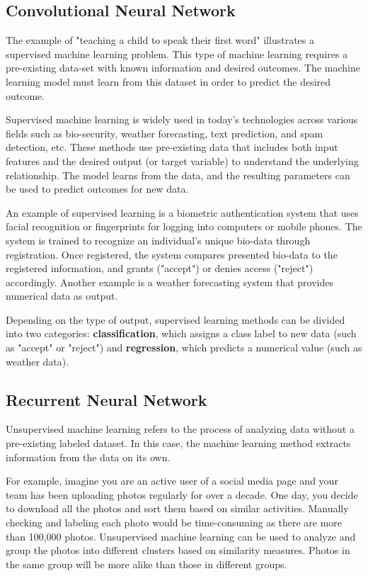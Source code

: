 \subsection{Convolutional Neural Network}
The example of "teaching a child to speak their first word" illustrates a supervised machine learning problem. This type of machine learning requires a pre-existing data-set with known information and desired outcomes. The machine learning model must learn from this dataset in order to predict the desired outcome.

Supervised machine learning is widely used in today's technologies across various fields such as bio-security, weather forecasting, text prediction, and spam detection, etc. These methods use pre-existing data that includes both input features and the desired output (or target variable) to understand the underlying relationship. The model learns from the data, and the resulting parameters can be used to predict outcomes for new data.

An example of supervised learning is a biometric authentication system that uses facial recognition or fingerprints for logging into computers or mobile phones. The system is trained to recognize an individual's unique bio-data through registration. Once registered, the system compares presented bio-data to the registered information, and grants ("accept") or denies access ("reject") accordingly. Another example is a weather forecasting system that provides numerical data as output.

Depending on the type of output, supervised learning methods can be divided into two categories: \textbf{classification}, which assigns a class label to new data (such as "accept" or "reject") and \textbf{regression}, which predicts a numerical value (such as weather data).

\subsection{Recurrent Neural Network}
Unsupervised machine learning refers to the process of analyzing data without a pre-existing labeled dataset. In this case, the machine learning method extracts information from the data on its own.

For example, imagine you are an active user of a social media page and your team has been uploading photos regularly for over a decade. One day, you decide to download all the photos and sort them based on similar activities. Manually checking and labeling each photo would be time-consuming as there are more than 100,000 photos. Unsupervised machine learning can be used to analyze and group the photos into different clusters based on similarity measures. Photos in the same group will be more alike than those in different groups.

